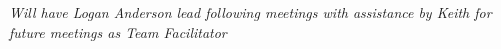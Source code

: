 \emph{\small{Will have Logan Anderson lead following meetings with assistance by Keith for future meetings as Team Facilitator}}